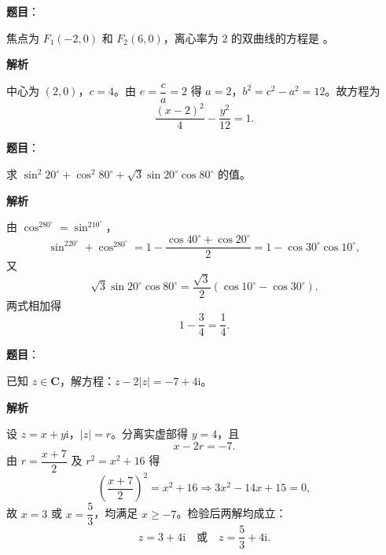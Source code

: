 \begin{answer}

\textbf{题目}：

焦点为 \(F_1(-2,0)\) 和 \(F_2(6,0)\)，离心率为 2 的双曲线的方程是 \underline{\qquad}。

\textbf{解析}

中心为 \((2,0)\)，\(c=4\)。由 \(e=\dfrac ca=2\) 得 \(a=2\)，\(b^2=c^2-a^2=12\)。故方程为
\nopagebreak[4]
\[
\frac{(x-2)^2}{4}-\frac{y^2}{12}=1.
\]


\end{answer}
\begin{answer}

\textbf{题目}：

求 \(\sin^2 20^\circ+\cos^2 80^\circ+\sqrt{3}\sin 20^\circ\cos 80^\circ\) 的值。

\textbf{解析}

由 \(\cos^280^\circ=\sin^210^\circ\)，
\nopagebreak[4]
\[
\sin^220^\circ+\cos^280^\circ
=1-\frac{\cos40^\circ+\cos20^\circ}{2}
=1-\cos30^\circ\cos10^\circ,
\]
又
\nopagebreak[4]
\[
\sqrt3\sin20^\circ\cos80^\circ
=\frac{\sqrt3}{2}\left(\cos10^\circ-\cos30^\circ\right).
\]
两式相加得
\nopagebreak[4]
\[
1-\frac34=\frac14.
\]


\end{answer}
\begin{answer}

\textbf{题目}：

已知 \(z\in\mathbf{C}\)，解方程：\(z-2|z|=-7+4\mathrm{i}\)。

\textbf{解析}

设 \(z=x+y\mathrm{i}\)，\(|z|=r\)。分离实虚部得 \(y=4\)，且
\nopagebreak[4]
\[
x-2r=-7.
\]
由 \(r=\dfrac{x+7}{2}\) 及 \(r^2=x^2+16\) 得
\nopagebreak[4]
\[
\left(\frac{x+7}{2}\right)^2=x^2+16
\Rightarrow 3x^2-14x+15=0,
\]
故 \(x=3\) 或 \(x=\dfrac53\)，均满足 \(x\geqslant-7\)。检验后两解均成立：
\nopagebreak[4]
\[
z=3+4\mathrm{i}\quad\text{或}\quad z=\frac53+4\mathrm{i}.
\]


\end{answer}
